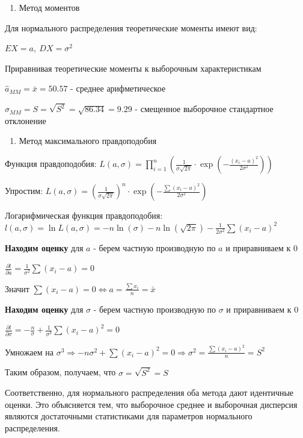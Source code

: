 \documentclass[11pt]{article}
\providecommand{\tightlist}{%
      \setlength{\itemsep}{0pt}\setlength{\parskip}{0pt}}
\begin{document}
\begin{enumerate}
\def\labelenumi{\arabic{enumi}.}
\tightlist
\item
  Метод моментов
\end{enumerate}

Для нормального распределения теоретические моменты имеют вид:

\(EX = a, \ DX = \sigma^2\)

Приравнивая теоретические моменты к выборочным характеристикам

\(\hat{a}_{MM} = \bar{x} = 50.57\) - среднее арифметическое

\(\hat{\sigma}_{MM} = S = \sqrt{S^2} = \sqrt{86.34} = 9.29\) - смещенное
выборочное стандартное отклонение

\begin{enumerate}
\def\labelenumi{\arabic{enumi}.}
\setcounter{enumi}{1}
\tightlist
\item
  Метод максимального правдоподобия
\end{enumerate}

Функция правдоподобия:
\(L(a, \sigma) = \prod_{i = 1}^n \left(\frac{1}{\sigma\sqrt{2\pi}} \cdot \exp\left(-\frac{(x_i - a)^2}{2\sigma^2}\right)\right)\)

Упростим:
\(L(a, \sigma) = \left(\frac{1}{\sigma\sqrt{2\pi}}\right)^n \cdot \exp\left(-\frac{\sum (x_i - a)^2}{2\sigma^2}\right)\)

Логарифмическая функция правдоподобия:
\(l(a, \sigma) = \ln L(a, \sigma) = -n \ln(\sigma) - n \ln(\sqrt{2\pi}) - \frac{1}{2\sigma^2} \sum (x_i - a)^2\)

\textbf{Находим оценку} для \(a\) - берем частную производную по \(a\) и
приравниваем к 0

\(\frac{\partial l}{\partial a} = \frac{1}{\sigma^2} \sum (x_i - a) = 0\)

Значит
\(\sum (x_i - a) = 0 \Leftrightarrow a = \frac{\sum x_i}{n} = \bar{x}\)

\textbf{Находим оценку} для \(\sigma\) - берем частную производную по
\(\sigma\) и приравниваем к 0

\(\frac{\partial l}{\partial \sigma} = -\frac{n}{\sigma} + \frac{1}{\sigma^3} \sum (x_i - a)^2 = 0\)

Умножаем на
\(\sigma^3 \Rightarrow -n \sigma^2 + \sum (x_i - a)^2 = 0 \Rightarrow \sigma^2 = \frac{\sum (x_i - a)^2}{n} = S^2\)

Таким образом, получаем, что \(\sigma = \sqrt{S^2} = S\)

Соответственно, для нормального распределения оба метода дают идентичные
оценки. Это объясняется тем, что выборочное среднее и выборочная
дисперсия являются достаточными статистиками для параметров нормального
распределения.
\end{document}
